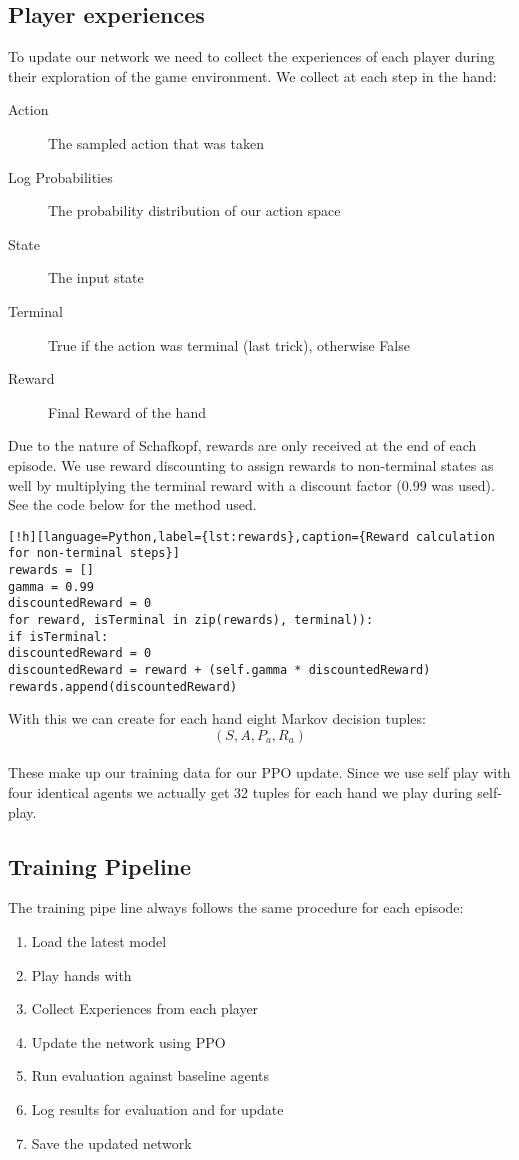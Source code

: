\subsection{Player experiences}
To update our network we need to collect the experiences of each player during their exploration of the game
environment.
We collect at each step in the hand:
\begin{description}
\item[Action] The sampled action that was taken
\item[Log Probabilities] The probability distribution of our action space
\item[State] The input state
\item[Terminal] True if the action was terminal (last trick), otherwise False
\item[Reward] Final Reward of the hand
\end{description}
Due to the nature of Schafkopf, rewards are only received at the end of each episode.
We use reward discounting to assign rewards to non-terminal states as well by multiplying the terminal reward with a
discount factor (0.99 was used). See the code below for the method used.
\begin{lstlisting}[!h][language=Python,label={lst:rewards},caption={Reward calculation for non-terminal steps}]
rewards = []
gamma = 0.99
discountedReward = 0
for reward, isTerminal in zip(rewards), terminal)):
if isTerminal:
discountedReward = 0
discountedReward = reward + (self.gamma * discountedReward)
rewards.append(discountedReward)
\end{lstlisting}
With this we can create for each hand eight Markov decision tuples: \[(S,A,P_{a},R_{a})\]\\
These make up our training data for our PPO update.
Since we use self play with four identical agents we actually get 32 tuples for each hand we play during self-play.

\subsection{Training Pipeline}
The training pipe line always follows the same procedure for each episode:
\begin{enumerate}
\item Load the latest model
\item Play hands with
\item Collect Experiences from each player
\item Update the network using PPO
\item Run evaluation against baseline agents
\item Log results for evaluation and for update
\item Save the updated network
\end{enumerate}
